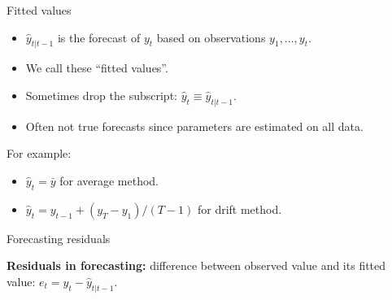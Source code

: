 \documentclass[
  14pt,
  ignorenonframetext,
  aspectratio=169,
]{beamer}
\providecommand{\tightlist}{%
  \setlength{\itemsep}{0pt}\setlength{\parskip}{0pt}}\usepackage{longtable,booktabs,array}
\begin{document}
\begin{frame}{Fitted values}
\protect\hypertarget{fitted-values}{}
\begin{itemize}
\tightlist
\item
  \(\hat{y}_{t|t-1}\) is the forecast of \(y_t\) based on observations
  \(y_1,\dots,y_t\).
\item
  We call these ``fitted values''.
\item
  Sometimes drop the subscript: \(\hat{y}_t \equiv \hat{y}_{t|t-1}\).
\item
  Often not true forecasts since parameters are estimated on all data.
\end{itemize}

\begin{block}{For example:}
\protect\hypertarget{for-example}{}
\begin{itemize}
\tightlist
\item
  \(\hat{y}_{t} = \bar{y}\) for average method.
\item
  \(\hat{y}_{t} = y_{t-1} + (y_{T}-y_1)/(T-1)\) for drift method.
\end{itemize}
\end{block}
\end{frame}

\begin{frame}{Forecasting residuals}
\protect\hypertarget{forecasting-residuals}{}
\begin{block}{}
\textbf{Residuals in forecasting:} difference between observed value and its fitted value: $e_t = y_t-\hat{y}_{t|t-1}$.
\end{block}
\pause\fontsize{13}{15}\sf
\end{frame}
\end{document}

